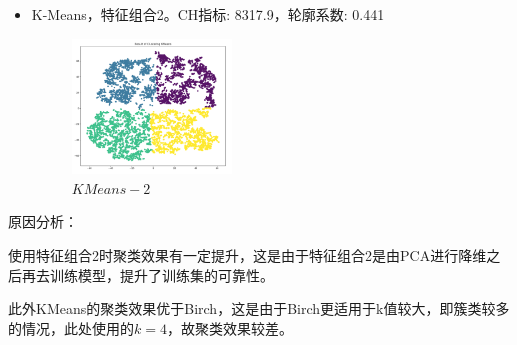 \documentclass{acm_proc_article-sp}
\begin{document}
\begin{itemize}
    \item K-Means，特征组合2。CH指标: 8317.9，轮廓系数: 0.441 
    \begin{figure}[H]
        \centering
        \caption{$KMeans-2$}
        \includegraphics[width=0.4\textwidth]{2-2.png}
    \end{figure}
\end{itemize}

原因分析：

使用特征组合2时聚类效果有一定提升，这是由于特征组合2是由PCA进行降维之后再去训练模型，提升了训练集的可靠性。

此外KMeans的聚类效果优于Birch，这是由于Birch更适用于k值较大，即簇类较多的情况，此处使用的$k=4$，故聚类效果较差。

\end{document}
